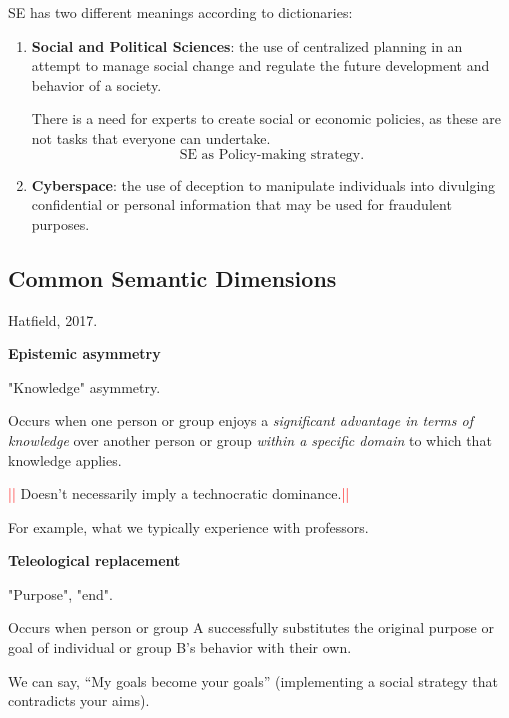 SE has two different meanings according to dictionaries: 
\begin{enumerate}
    \item \textbf{Social and Political Sciences}: the use of centralized planning in an attempt to manage social change and regulate the future development and behavior of a society.
    
    \vspace{0.1cm}

    There is a need for experts to create social or economic policies, as these are not tasks that everyone can undertake.
    \[
        \text{SE as Policy-making strategy.}
    \]
    \item \textbf{Cyberspace}: the use of deception to manipulate individuals into divulging confidential or personal information that may be used for fraudulent purposes.
\end{enumerate}

\subsection*{Common Semantic Dimensions}
\begin{center}
    Hatfield, 2017.
\end{center}
\raggedcolumns
\begin{multicols}{2}
    \begin{center}
    \textbf{Epistemic asymmetry}
    \end{center}
    "Knowledge" asymmetry.

    Occurs when one person or group enjoys a \textit{significant advantage in terms of knowledge} over another person or group \textit{within a specific domain} to which that knowledge applies. 

    \vspace{0.1cm}

    \textcolor{Red}{||} Doesn't necessarily imply a technocratic dominance.\textcolor{Red}{||}

    \vspace{0.2cm}
    For example, what we typically experience with professors.

    \columnbreak

    \begin{center}
    \textbf{Teleological replacement}
    \end{center}
    "Purpose", "end".

    Occurs when person or group A successfully substitutes the original purpose or goal of individual or group B’s behavior with their own.

    \vspace{0.1cm}

    We can say, “My goals become your goals” (implementing a social strategy that contradicts your aims).
    
\end{multicols}

